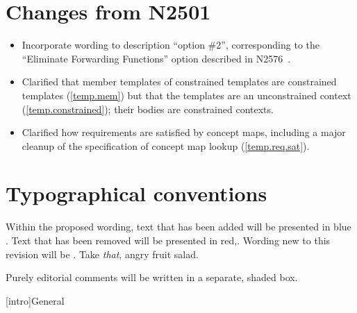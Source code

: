 \documentclass[american]{book}
\newcommand{\editorial}[1]{\colorbox{editbackground}{\begin{minipage}{\linewidth
}#1\end{minipage}}}
\begin{document}
\begin{titlepage}
\section*{Changes from N2501}
\begin{itemize}
\item Incorporate wording to description ``option \#2'', corresponding
  to the ``Eliminate Forwarding Functions'' option described in
  N2576~\cite{gregor08:soundness}.
\item Clarified that member templates of constrained templates are
  constrained templates (\ref{temp.mem}) but that the
  templates are an unconstrained context (\ref{temp.constrained});
  their bodies are constrained contexts.
\item Clarified how requirements are satisfied by concept maps,
  including a major cleanup of the specification of concept map lookup
  (\ref{temp.req.sat}).
\end{itemize}

\section*{Typographical conventions}
Within the proposed wording, text that has been added
\textcolor{addclr}{will be presented in blue} . Text that has been removed will be
presented \textcolor{remclr}{in red},. Wording new to this revision will be 
. Take \emph{that}, angry fruit salad.

\editorial{Purely editorial comments will be written in a separate,
  shaded box.}
\end{titlepage}

\pagestyle{fancy}
\fancyhead[LE,RO]{\textbf{\rightmark}}
\fancyhead[RE]{\textbf{\leftmark\hspace{1em}\thepage}}
\fancyhead[LO]{\textbf{\thepage\hspace{1em}\leftmark}}


\renewcommand{\sectionmark}[1]{\markright{\thesection\hspace{1em}#1}}
\renewcommand{\chaptermark}[1]{\markboth{#1}{}}

[intro]{General}
\end{document}
